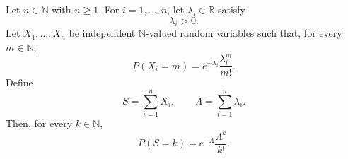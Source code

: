\begin{theorem}
Let $n\in\mathbb{N}$ with $n\ge 1$. For $i=1,\ldots,n$, let
$\lambda_i\in\mathbb{R}$ satisfy
\[
\lambda_i>0.
\]
Let $X_1,\ldots,X_n$ be independent $\mathbb{N}$-valued random variables
such that, for every $m\in\mathbb{N}$,
\[
P(X_i=m)=e^{-\lambda_i}\frac{\lambda_i^m}{m!}.
\]
Define
\[
S=\sum_{i=1}^n X_i,
\qquad
\Lambda=\sum_{i=1}^n\lambda_i.
\]
Then, for every $k\in\mathbb{N}$,
\[
P(S=k)=e^{-\Lambda}\frac{\Lambda^k}{k!}.
\]
\end{theorem}
